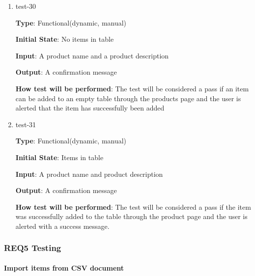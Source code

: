 \documentclass[12pt, titlepage]{article}
\begin{document}
\begin{enumerate}

\item{test-30\\}

\textbf{Type}: Functional(dynamic, manual)
					
\textbf{Initial State}: No items in table
					
\textbf{Input}: A product name and a product description
					
\textbf{Output}: A confirmation message
					
\textbf{How test will be performed}: The test will be considered a pass if an item can be added to an empty table through the products page and the user is alerted that the item has successfully been added
					
\item{test-31\\}

\textbf{Type}: Functional(dynamic, manual)
					
\textbf{Initial State}: Items in table
					
\textbf{Input}: A product name and product description
					
\textbf{Output}: A confirmation message
					
\textbf{How test will be performed}: The test will be considered a pass if the item was successfully added to the table through the product page and the user is alerted with a success message.

\end{enumerate}

\subsubsection{REQ5 Testing}
		
\paragraph{Import items from CSV document}
\end{document}
